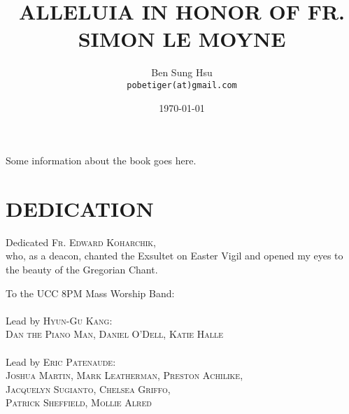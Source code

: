 \documentclass[11pt,oneside]{book} %
\begin{document}

\def\greinitialformat#1{%
  {\fontsize{43}{43}\selectfont #1}%
}

\redlines


\frontmatter

\title{ALLELUIA IN HONOR OF FR. SIMON LE MOYNE}
\author{Ben Sung Hsu\\
  \texttt{pobetiger(at)gmail.com}}
\date{\today}
\maketitle


\begin{paragraph}\noindent
Some information about the book goes here.
\end{paragraph}



\chapter{DEDICATION}
\begin{paragraph}
Dedicated \textsc{Fr. Edward Koharchik},\\
who, as a deacon, chanted the Exsultet on Easter Vigil
and opened my eyes to the beauty of the Gregorian Chant.
\end{paragraph}

\begin{paragraph}
To the UCC 8PM Mass Worship Band:\\\\
Lead by \textsc{Hyun-Gu Kang:\\
Dan the Piano Man, Daniel O'Dell, Katie Halle}\\\\
Lead by \textsc{Eric Patenaude:\\
Joshua Martin, Mark Leatherman, Preston Achilike,\\
Jacquelyn Sugianto, Chelsea Griffo,\\
Patrick Sheffield, Mollie Alred}\\
\end{paragraph}
\end{document}
